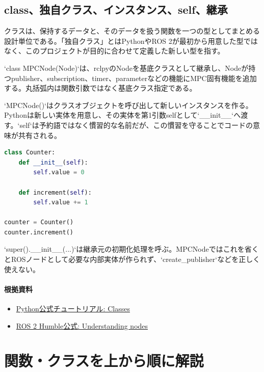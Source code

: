 \documentclass[a4paper,11pt]{article}
\begin{document}
\subsection{class、独自クラス、インスタンス、self、継承}
クラスは、保持するデータと、そのデータを扱う関数を一つの型としてまとめる設計単位である。「独自クラス」とはPythonやROS 2が最初から用意した型ではなく、このプロジェクトが目的に合わせて定義した新しい型を指す。


`class MPCNode(Node)`は、rclpyのNodeを基底クラスとして継承し、Nodeが持つpublisher、subscription、timer、parameterなどの機能にMPC固有機能を追加する。丸括弧内は関数引数ではなく基底クラス指定である。


`MPCNode()`はクラスオブジェクトを呼び出して新しいインスタンスを作る。Pythonは新しい実体を用意し、その実体を第1引数selfとして`\_\_init\_\_`へ渡す。`self`は予約語ではなく慣習的な名前だが、この慣習を守ることでコードの意味が共有される。


\begin{lstlisting}[language=python]
class Counter:
    def __init__(self):
        self.value = 0

    def increment(self):
        self.value += 1

counter = Counter()
counter.increment()
\end{lstlisting}


`super().\_\_init\_\_(...)`は継承元の初期化処理を呼ぶ。MPCNodeではこれを省くとROSノードとして必要な内部実体が作られず、`create\_publisher`などを正しく使えない。

\paragraph{根拠資料}
\begin{itemize}[leftmargin=1.6em]
\item \href{https://docs.python.org/3/tutorial/classes.html}{Python公式チュートリアル: Classes}
\item \href{https://docs.ros.org/en/humble/Tutorials/Beginner-CLI-Tools/Understanding-ROS2-Nodes/Understanding-ROS2-Nodes.html}{ROS 2 Humble公式: Understanding nodes}
\end{itemize}



        \section{関数・クラスを上から順に解説}
\end{document}
